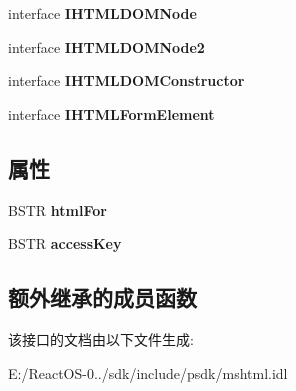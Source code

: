 \begin{DoxyCompactItemize}
\item 
\mbox{\label{interface_m_s_h_t_m_l_1_1_i_h_t_m_l_label_element_ac5cc0a681d88808c241a23ae528abb1d}} 
interface {\bfseries I\+H\+T\+M\+L\+D\+O\+M\+Node}
\item 
\mbox{\label{interface_m_s_h_t_m_l_1_1_i_h_t_m_l_label_element_a018940a93d446d8f54b21f4ec03aa062}} 
interface {\bfseries I\+H\+T\+M\+L\+D\+O\+M\+Node2}
\item 
\mbox{\label{interface_m_s_h_t_m_l_1_1_i_h_t_m_l_label_element_a9ccc715b36a72e018ba421b91fd18e0b}} 
interface {\bfseries I\+H\+T\+M\+L\+D\+O\+M\+Constructor}
\item 
\mbox{\label{interface_m_s_h_t_m_l_1_1_i_h_t_m_l_label_element_a2c78b8bf88033f85600b4a5a02cb961d}} 
interface {\bfseries I\+H\+T\+M\+L\+Form\+Element}
\end{DoxyCompactItemize}
\subsection*{属性}
\begin{DoxyCompactItemize}
\item 
\mbox{\label{interface_m_s_h_t_m_l_1_1_i_h_t_m_l_label_element_ae7c21f20392e37723a98d3ee7633bfe1}} 
B\+S\+TR {\bfseries html\+For}
\item 
\mbox{\label{interface_m_s_h_t_m_l_1_1_i_h_t_m_l_label_element_ab4cc0c78ea2feb0e0d69c81ce924a35a}} 
B\+S\+TR {\bfseries access\+Key}
\end{DoxyCompactItemize}
\subsection*{额外继承的成员函数}


该接口的文档由以下文件生成\+:\begin{DoxyCompactItemize}
\item 
E\+:/\+React\+O\+S-\/0../sdk/include/psdk/mshtml.\+idl\end{DoxyCompactItemize}
